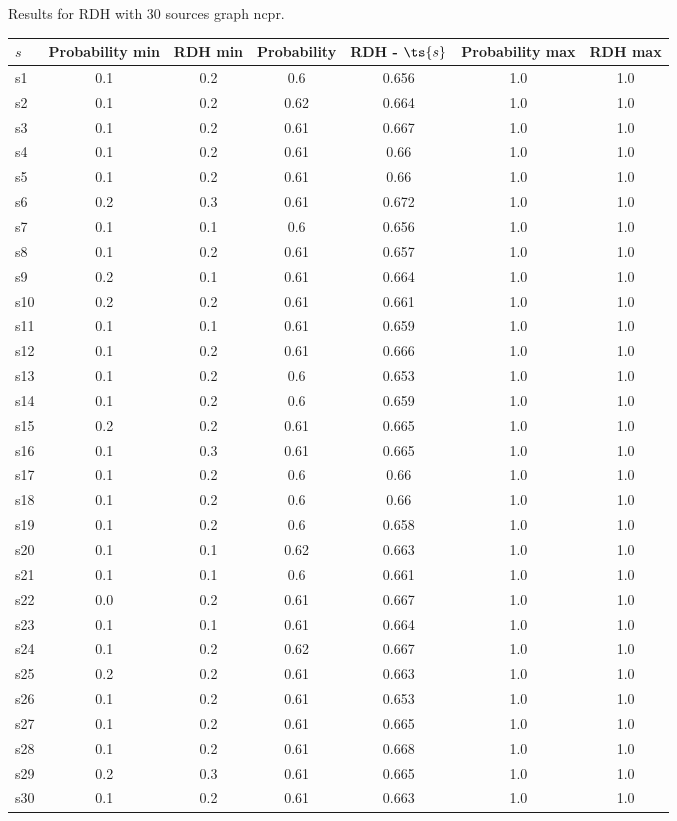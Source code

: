 \documentclass{article}
\begin{document}
\noindent Results for RDH with 30 sources graph ncpr.

\noindent\begin{tabular}{|l|c|c|c|c|c|c|}
\hline
$s$& Probability min & RDH min & Probability & RDH - $\ts{s}$ & Probability max & RDH max\\
\hline
s1 &0.1 & 0.2 & 0.6 & 0.656 & 1.0 & 1.0\\
\hline
s2 &0.1 & 0.2 & 0.62 & 0.664 & 1.0 & 1.0\\
\hline
s3 &0.1 & 0.2 & 0.61 & 0.667 & 1.0 & 1.0\\
\hline
s4 &0.1 & 0.2 & 0.61 & 0.66 & 1.0 & 1.0\\
\hline
s5 &0.1 & 0.2 & 0.61 & 0.66 & 1.0 & 1.0\\
\hline
s6 &0.2 & 0.3 & 0.61 & 0.672 & 1.0 & 1.0\\
\hline
s7 &0.1 & 0.1 & 0.6 & 0.656 & 1.0 & 1.0\\
\hline
s8 &0.1 & 0.2 & 0.61 & 0.657 & 1.0 & 1.0\\
\hline
s9 &0.2 & 0.1 & 0.61 & 0.664 & 1.0 & 1.0\\
\hline
s10 &0.2 & 0.2 & 0.61 & 0.661 & 1.0 & 1.0\\
\hline
s11 &0.1 & 0.1 & 0.61 & 0.659 & 1.0 & 1.0\\
\hline
s12 &0.1 & 0.2 & 0.61 & 0.666 & 1.0 & 1.0\\
\hline
s13 &0.1 & 0.2 & 0.6 & 0.653 & 1.0 & 1.0\\
\hline
s14 &0.1 & 0.2 & 0.6 & 0.659 & 1.0 & 1.0\\
\hline
s15 &0.2 & 0.2 & 0.61 & 0.665 & 1.0 & 1.0\\
\hline
s16 &0.1 & 0.3 & 0.61 & 0.665 & 1.0 & 1.0\\
\hline
s17 &0.1 & 0.2 & 0.6 & 0.66 & 1.0 & 1.0\\
\hline
s18 &0.1 & 0.2 & 0.6 & 0.66 & 1.0 & 1.0\\
\hline
s19 &0.1 & 0.2 & 0.6 & 0.658 & 1.0 & 1.0\\
\hline
s20 &0.1 & 0.1 & 0.62 & 0.663 & 1.0 & 1.0\\
\hline
s21 &0.1 & 0.1 & 0.6 & 0.661 & 1.0 & 1.0\\
\hline
s22 &0.0 & 0.2 & 0.61 & 0.667 & 1.0 & 1.0\\
\hline
s23 &0.1 & 0.1 & 0.61 & 0.664 & 1.0 & 1.0\\
\hline
s24 &0.1 & 0.2 & 0.62 & 0.667 & 1.0 & 1.0\\
\hline
s25 &0.2 & 0.2 & 0.61 & 0.663 & 1.0 & 1.0\\
\hline
s26 &0.1 & 0.2 & 0.61 & 0.653 & 1.0 & 1.0\\
\hline
s27 &0.1 & 0.2 & 0.61 & 0.665 & 1.0 & 1.0\\
\hline
s28 &0.1 & 0.2 & 0.61 & 0.668 & 1.0 & 1.0\\
\hline
s29 &0.2 & 0.3 & 0.61 & 0.665 & 1.0 & 1.0\\
\hline
s30 &0.1 & 0.2 & 0.61 & 0.663 & 1.0 & 1.0\\
\hline
\end{tabular}\\
\end{document}
